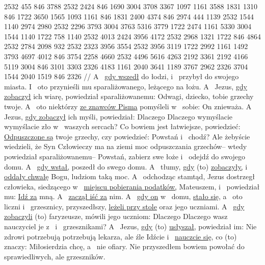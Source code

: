 {} 2532 455 846 3788 2532 2424 846 1690 3004 3708 {} 3367 {} 1097 {}
{} 1161 3588 1831 1310 846 1722 3650 1565 1093
{} 1161 846 1831 2400 4374 846 2974 444 1139
{} 2532 1544 1140 2974 2980 2532 2296 3793 3004 3763 5316 3779 {} 1722 2474
{} 1161 5330 3004 1544 1140 1722 758 {} 1140
{} 2532 4013 2424 3956 4172 2532 2968 1321 1722 846 4864 2532 2784 2098 932 2532 2323 3956 3554 2532 3956 3119 1722 2992
{} 1161 1492 3793 4697 4012 846 3754 2258 4660 2532 4496 5616 4263 2192 3361 2192 4166
{} 5119 3004 846 3101 3303 2326 4183 1161 2040 3641
{} 1189 3767 2962 2326 3704 1544 2040 1519 846 2326
//
\glb
 A~ \underline{gdy wszedł} do łodzi,  i~ przybył do swojego miasta.
 I~ oto przynieśli mu sparaliżowanego, leżącego na łożu. A~ Jezus, \underline{gdy zobaczył} ich wiarę, powiedział sparaliżowanemu: Odwagi, dziecko,  tobie grzechy twoje.
 A~ oto niektórzy \underline{ze znawców Pisma} pomyśleli w~ sobie: On znieważa.
 A~ Jezus, \underline{gdy zobaczył} ich myśli, powiedział: Dlaczego Dlaczego wymyślacie wymyślacie zło w~ waszych sercach?
 Co bowiem jest łatwiejsze, powiedzieć: \underline{Odpuszczone są} twoje grzechy, czy powiedzieć: Powstań i~ chodź?
 Ale żebyście wiedzieli, że Syn Człowieczy ma na ziemi moc odpuszczania grzechów– wtedy powiedział sparaliżowanemu– Powstań, zabierz swe łoże i~ odejdź do swojego domu.
 A~ \underline{gdy wstał,} poszedł do swego domu.
 A~ tłumy, \underline{gdy} (to) \underline{zobaczyły,}  i~ \underline{oddały chwałę} Bogu,  ludziom taką moc.
 A~ odchodząc stamtąd, Jezus dostrzegł człowieka, siedzącego w~ \underline{miejscu pobierania podatków,}  Mateuszem, i~ powiedział mu: \underline{Idź za} mną. A~  \underline{zaczął iść za} nim.
 A~ \underline{gdy on}  w~ domu, \underline{stało się,} a~ oto liczni  i~ grzesznicy, przyszedłszy, \underline{leżeli przy stole}  oraz jego uczniami.
 A~ \underline{gdy zobaczyli} (to) faryzeusze, mówili jego uczniom: Dlaczego Dlaczego wasz nauczyciel je z~  i~ grzesznikami?
 A~ Jezus, \underline{gdy} (to) \underline{usłyszał,} powiedział im: Nie zdrowi potrzebują potrzebują lekarza, ale  źle 
 Idźcie i~ \underline{nauczcie się,} co (to) znaczy: Miłosierdzia chcę, a~ nie ofiary. Nie przyszedłem bowiem powołać do  sprawiedliwych, ale grzeszników.
